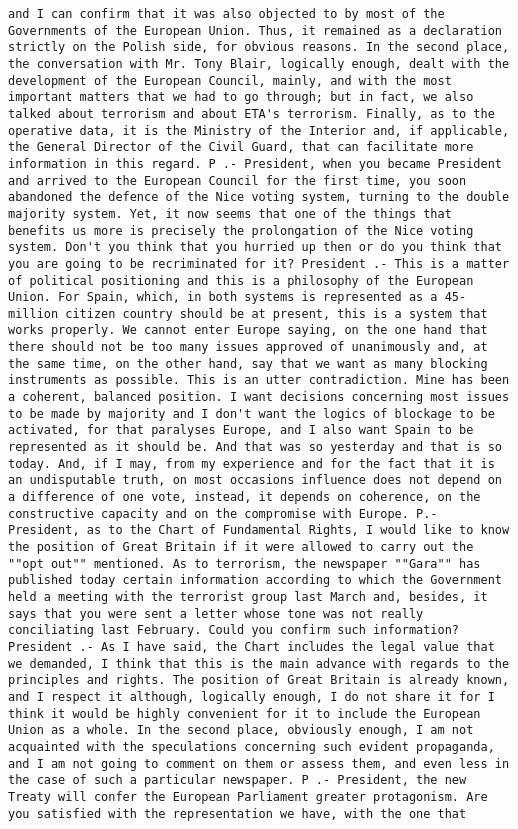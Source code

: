 \documentclass[
]{article}
\begin{document}
\begin{verbatim}
and I can confirm that it was also objected to by most of the Governments of the European Union. Thus, it remained as a declaration strictly on the Polish side, for obvious reasons. In the second place, the conversation with Mr. Tony Blair, logically enough, dealt with the development of the European Council, mainly, and with the most important matters that we had to go through; but in fact, we also talked about terrorism and about ETA's terrorism. Finally, as to the operative data, it is the Ministry of the Interior and, if applicable, the General Director of the Civil Guard, that can facilitate more information in this regard. P .- President, when you became President and arrived to the European Council for the first time, you soon abandoned the defence of the Nice voting system, turning to the double majority system. Yet, it now seems that one of the things that benefits us more is precisely the prolongation of the Nice voting system. Don't you think that you hurried up then or do you think that you are going to be recriminated for it? President .- This is a matter of political positioning and this is a philosophy of the European Union. For Spain, which, in both systems is represented as a 45-million citizen country should be at present, this is a system that works properly. We cannot enter Europe saying, on the one hand that there should not be too many issues approved of unanimously and, at the same time, on the other hand, say that we want as many blocking instruments as possible. This is an utter contradiction. Mine has been a coherent, balanced position. I want decisions concerning most issues to be made by majority and I don't want the logics of blockage to be activated, for that paralyses Europe, and I also want Spain to be represented as it should be. And that was so yesterday and that is so today. And, if I may, from my experience and for the fact that it is an undisputable truth, on most occasions influence does not depend on a difference of one vote, instead, it depends on coherence, on the constructive capacity and on the compromise with Europe. P.- President, as to the Chart of Fundamental Rights, I would like to know the position of Great Britain if it were allowed to carry out the ""opt out"" mentioned. As to terrorism, the newspaper ""Gara"" has published today certain information according to which the Government held a meeting with the terrorist group last March and, besides, it says that you were sent a letter whose tone was not really conciliating last February. Could you confirm such information? President .- As I have said, the Chart includes the legal value that we demanded, I think that this is the main advance with regards to the principles and rights. The position of Great Britain is already known, and I respect it although, logically enough, I do not share it for I think it would be highly convenient for it to include the European Union as a whole. In the second place, obviously enough, I am not acquainted with the speculations concerning such evident propaganda, and I am not going to comment on them or assess them, and even less in the case of such a particular newspaper. P .- President, the new Treaty will confer the European Parliament greater protagonism. Are you satisfied with the representation we have, with the one that 
\end{verbatim}
\end{document}
